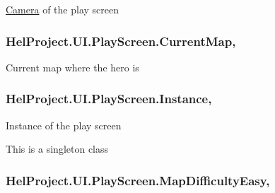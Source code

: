 \hyperlink{class_hel_project_1_1_u_i_1_1_camera}{Camera} of the play screen 

\hypertarget{class_hel_project_1_1_u_i_1_1_play_screen_ad7c470e2c8f452c734ec3dc1fa6e3061}{}
\subsubsection[{Current\+Map}]{ Hel\+Project.\+U\+I.\+Play\+Screen.\+Current\+Map\hspace{0.3cm}{\ttfamily [get]}, {\ttfamily [set]}}\label{class_hel_project_1_1_u_i_1_1_play_screen_ad7c470e2c8f452c734ec3dc1fa6e3061}


Current map where the hero is 

\hypertarget{class_hel_project_1_1_u_i_1_1_play_screen_a0611d9168457e37ecfd8a1758dc0f969}{}
\subsubsection[{Instance}]{ Hel\+Project.\+U\+I.\+Play\+Screen.\+Instance\hspace{0.3cm}{\ttfamily [static]}, {\ttfamily [get]}}\label{class_hel_project_1_1_u_i_1_1_play_screen_a0611d9168457e37ecfd8a1758dc0f969}


Instance of the play screen 

This is a singleton class \hypertarget{class_hel_project_1_1_u_i_1_1_play_screen_a6fa66d24cfdc2801ecfd0e72f1c1669b}{}
\subsubsection[{Map\+Difficulty\+Easy}]{ Hel\+Project.\+U\+I.\+Play\+Screen.\+Map\+Difficulty\+Easy\hspace{0.3cm}{\ttfamily [get]}, {\ttfamily [set]}}\label{class_hel_project_1_1_u_i_1_1_play_screen_a6fa66d24cfdc2801ecfd0e72f1c1669b}


